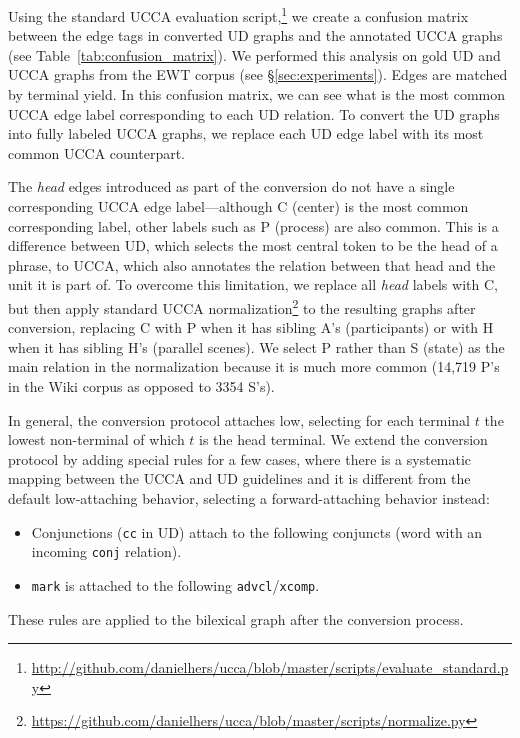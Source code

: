 \documentclass[11pt,a4paper]{article}
\begin{document}
Using the standard UCCA evaluation
script,\footnote{\url{http://github.com/danielhers/ucca/blob/master/scripts/evaluate_standard.py}}
we create a confusion matrix between the edge tags in converted UD graphs
and the annotated UCCA graphs (see Table~\ref{tab:confusion_matrix}).
We performed this analysis on gold UD and UCCA graphs from the EWT corpus (see \S\ref{sec:experiments}).
Edges are matched by terminal yield.
In this confusion matrix, we can see what is the most common UCCA edge label corresponding
to each UD relation.
To convert the UD graphs into fully labeled UCCA graphs,
we replace each UD edge label with its most common UCCA counterpart.

The \textit{head} edges introduced as part of the conversion do not have a single
corresponding UCCA edge label---although C (center) is the most common corresponding label,
other labels such as P (process) are also common.
This is a difference between UD, which selects the most central token to be the head of a phrase,
to UCCA, which also annotates the relation between that head and the unit it is part of.
To overcome this limitation, we replace all \textit{head} labels with C, but then
apply standard UCCA
normalization\footnote{\url{https://github.com/danielhers/ucca/blob/master/scripts/normalize.py}}
to the resulting graphs after conversion,
replacing C with P when it has sibling A's (participants) or
with H when it has sibling H's (parallel scenes).
We select P rather than S (state) as the main relation in the normalization because
it is much more common (14,719 P's in the Wiki corpus as opposed to 3354 S's).

In general, the conversion protocol attaches low,
selecting for each terminal $t$ the lowest non-terminal of which $t$
is the head terminal.
We extend the conversion protocol by adding special rules for a few cases,
where there is a systematic mapping between the UCCA and UD guidelines
and it is different from the default low-attaching behavior,
selecting a forward-attaching behavior instead:
\begin{itemize}
  \item Conjunctions (\verb|cc| in UD) attach to the following
  conjuncts (word with an incoming \verb|conj| relation).
  \item \verb|mark| is attached to the following \verb|advcl|/\verb|xcomp|.
\end{itemize}
These rules are applied to the bilexical graph after the conversion process.
\end{document}
